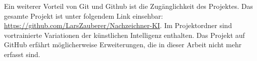 Ein weiterer Vorteil von Git und Github ist die Zugänglichkeit des Projektes.
Das gesamte Projekt ist unter folgendem Link einsehbar:
\url{https://github.com/LarsZauberer/Nachzeichner-KI}. Im Projektordner sind
vortrainierte Variationen der künstlichen Intelligenz enthalten. Das Projekt auf
GitHub erfährt möglicherweise Erweiterungen, die in dieser Arbeit nicht mehr
erfasst sind.
